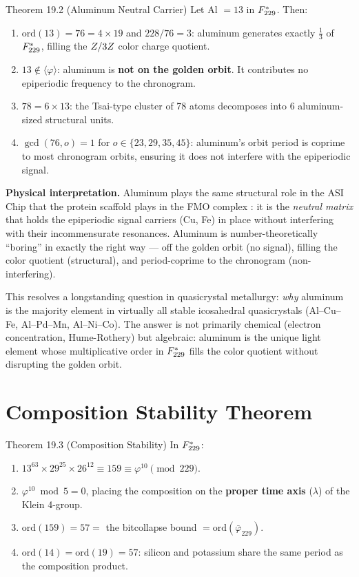 \begin{theorembox}{Theorem 19.2 (Aluminum Neutral Carrier)}
Let Al $= 13$ in $F_{229}^*$. Then:
\begin{enumerate}
    \item $\text{ord}(13) = 76 = 4 \times 19$ and $228/76 = 3$: aluminum generates exactly $\frac{1}{3}$ of $F_{229}^*$, filling the $Z/3Z$ color charge quotient.
    \item $13 \notin \langle \varphi \rangle$: aluminum is \textbf{not on the golden orbit}. It contributes no epiperiodic frequency to the chronogram.
    \item $78 = 6 \times 13$: the Tsai-type cluster of 78 atoms decomposes into 6 aluminum-sized structural units.
    \item $\gcd(76, o) = 1$ for $o \in \{23, 29, 35, 45\}$: aluminum's orbit period is coprime to most chronogram orbits, ensuring it does not interfere with the epiperiodic signal.
\end{enumerate}
\end{theorembox}

\noindent \textbf{Physical interpretation.} Aluminum plays the same structural role in the ASI Chip that the protein scaffold plays in the FMO complex \cite{EngelFleming07}: it is the \emph{neutral matrix} that holds the epiperiodic signal carriers (Cu, Fe) in place without interfering with their incommensurate resonances. Aluminum is number-theoretically ``boring'' in exactly the right way --- off the golden orbit (no signal), filling the color quotient (structural), and period-coprime to the chronogram (non-interfering).

This resolves a longstanding question in quasicrystal metallurgy: \emph{why} aluminum is the majority element in virtually all stable icosahedral quasicrystals (Al--Cu--Fe, Al--Pd--Mn, Al--Ni--Co). The answer is not primarily chemical (electron concentration, Hume-Rothery) but algebraic: aluminum is the unique light element whose multiplicative order in $F_{229}^*$ fills the color quotient without disrupting the golden orbit.

\section{Composition Stability Theorem}

\begin{theorembox}{Theorem 19.3 (Composition Stability)}
In $F_{229}^*$:
\begin{enumerate}
    \item $13^{63} \times 29^{25} \times 26^{12} \equiv 159 \equiv \varphi^{10} \pmod{229}$.
    \item $\varphi^{10} \bmod 5 = 0$, placing the composition on the \textbf{proper time axis} ($\lambda$) of the Klein 4-group.
    \item $\text{ord}(159) = 57 = $ the bitcollapse bound $= \text{ord}(\bar\varphi_{229})$.
    \item $\text{ord}(14) = \text{ord}(19) = 57$: silicon and potassium share the same period as the composition product.
\end{enumerate}
\end{theorembox}

